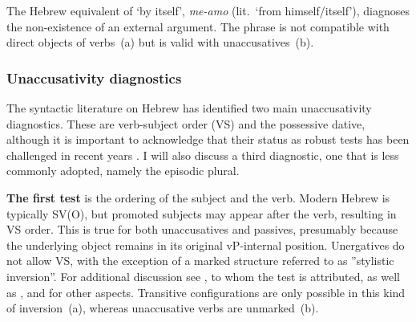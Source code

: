 \begin{exe}
\begin{xlist}
\begin{exe}
\begin{xlist}
\begin{exe}
\begin{xlist}
\begin{exe}
\begin{exe}
\begin{xlist}
		
 \z
\z 	

The Hebrew equivalent of `by itself', \emph{me-a{\ts}mo} (lit.~`from himself/itself'), diagnoses the non-existence of an external argument. The phrase is not compatible with direct objects of  verbs~(\nextx a) but is valid with unaccusatives~(\nextx b).
 \begin{exe}
 \ex  
 \begin{xlist} 
		
		
 \z
\z 


		\subsubsection{Unaccusativity diagnostics} \label{voice:tkal:nact:unacc}
The syntactic literature on Hebrew has identified two main unaccusativity diagnostics. These are verb-subject order (VS) and the possessive dative, although it is important to acknowledge that their status as robust tests has been challenged in recent years \citep{gafter14li,linzen14pd,kastner17gjgl}. I will also discuss a third diagnostic, one that is less commonly adopted, namely the episodic plural.

\textbf{The first test} is the ordering of the subject and the verb. Modern Hebrew is typically SV(O), but promoted subjects may appear after the verb, resulting in VS order. This is true for both unaccusatives and passives, presumably because the underlying object remains in its original vP-internal position. Unergatives do not allow VS, with the exception of a marked structure referred to as ''stylistic inversion''. For additional discussion see \cite{shlonsky87}, to whom the test is attributed, as well as \cite{shlonskydoron91}, \cite{borer95} and \cite{preminger10} for other aspects. Transitive configurations are only possible in this kind of inversion~(\nextx a), whereas unaccusative verbs are unmarked~(\nextx b).


\end{xlist}
\end{exe}
\end{xlist}
\end{exe}
\end{exe}
\end{xlist}
\end{exe}
\end{xlist}
\end{exe}
\end{xlist}
\end{exe}
